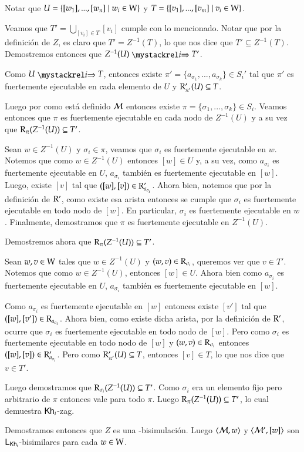 \begin{demostracion}
\begin{itemize}
        Notar que $U = \{[w_1],...,[w_n]\mid w_i \in \mathrm{W} \}$ y $T = \{[v_1],...,[v_m]\mid v_i \in \mathrm{W} \}$.
        
        Veamos que $T' = \bigcup\limits_{[v_i] \in T} [v_i]$ cumple con lo mencionado. Notar que por la definición de $Z$, es claro que $T' = Z^{-1}(T)$, lo que nos dice que $T' \subseteq Z^{-1}(T)$. Demostremos entonces que $Z^{-1}(U) \ultsExecAgi T'$. 
    
        Como $U \ultsExecAgi T$, entonces existe $\pi' = \{a_{\sigma_1},...,a_{\sigma_k}\}\in S_i'$ tal que $\pi'$ es fuertemente ejecutable en cada elemento de $U$ y $\mathrm{R}'_{\pi'}(U) \subseteq T$.

        Luego por como está definido $\mathcal{M}$ entonces existe $\pi = \{\sigma_1,...,\sigma_k\} \in S_i$. Veamos entonces que $\pi$ es fuertemente ejecutable en cada nodo de $Z^{-1}(U)$ y a su vez que $\mathrm{R}_\pi(Z^{-1}(U)) \subseteq T'$.

        Sean $w \in Z^{-1}(U)$ y $\sigma_i \in \pi$, veamos que $\sigma_i$ es fuertemente ejecutable en $w$. Notemos que como $w \in Z^{-1}(U)$ entonces $[w] \in U$ y, a su vez, como $a_{\sigma_i}$ es fuertemente ejecutable en $U$, $a_{\sigma_i}$ también es fuertemente ejecutable en $[w]$. Luego, existe $[v]$ tal que $([w],[v]) \in \mathrm{R}'_{a_{\sigma_i}}$. Ahora bien, notemos que por la definición de $\mathrm{R}'$, como existe esa arista entonces se cumple que $\sigma_i$ es fuertemente ejecutable en todo nodo de $[w]$. En particular, $\sigma_i$ es fuertemente ejecutable en $w$. Finalmente, demostramos que $\pi$ es fuertemente ejecutable en $Z^{-1}(U)$.

        Demostremos ahora que $\mathrm{R}_{\pi}(Z^{-1}(U)) \subseteq T'$. 

        Sean $w, v \in \mathrm{W}$ tales que $w \in Z^{-1}(U)$ y $(w,v) \in \mathrm{R}_{\sigma_i}$, queremos ver que $v \in T'$. Notemos que como $w \in Z^{-1}(U)$, entonces $[w] \in U$. Ahora bien como $a_{\sigma_i}$ es fuertemente ejecutable en $U$, $a_{\sigma_i}$ también es fuertemente ejecutable en $[w]$.
        
        Como $a_{\sigma_i}$ es fuertemente ejecutable en $[w]$ entonces existe $[v']$ tal que $([w],[v']) \in \mathrm{R}_{a_{\sigma_i}}$. Ahora bien, como existe dicha arista, por la definición de $\mathrm{R}'$, ocurre que $\sigma_i$ es fuertemente ejecutable en todo nodo de $[w]$. Pero como $\sigma_i$ es fuertemente ejecutable en todo nodo de $[w]$ y $(w,v) \in \mathrm{R}_{\sigma_i}$ entonces $([w],[v]) \in \mathrm{R}'_{a_{\sigma_i}}$. Pero como $\mathrm{R}'_{\pi'}(U) \subseteq T$, entonces $[v] \in T$, lo que nos dice que $v \in T'$.
        
        Luego demostramos que $\mathrm{R}_{\sigma_i}(Z^{-1}(U)) \subseteq T'$. Como $\sigma_i$ era un elemento fijo pero arbitrario de $\pi$ entonces vale para todo $\pi$. Luego $\mathrm{R}_\pi(Z^{-1}(U)) \subseteq T'$, lo cual demuestra $\mathsf{Kh}_i$-zag.
    \end{itemize}

    Demostramos entonces que $Z$ es una \KHilogic-bisimulación. Luego $\langle \mathcal{M},w \rangle$ y $\langle \mathcal{M}',[w] \rangle$ son $\mathsf{L}_{\mathsf{Kh}_i}$-bisimilares para cada $w \in \mathrm{W}$.
    
\end{demostracion}



